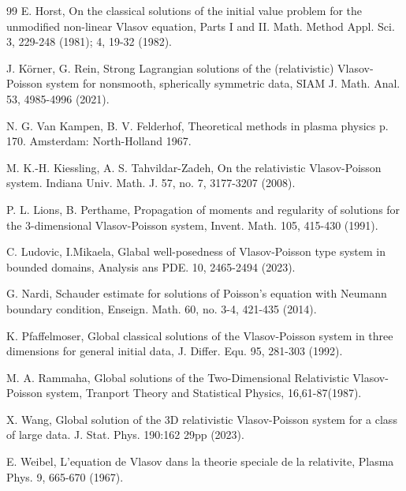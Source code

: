 \documentclass[11pt,reqno]{amsart}%
\theoremstyle{definition}
\theoremstyle{remark}
\begin{document}
\begin{thebibliography}{99}
E. Horst, On the classical solutions of the initial value problem for the unmodified non-linear Vlasov
equation, Parts I and II. Math. Method Appl. Sci. 3, 229-248 (1981); 4, 19-32 (1982).

J. K\"{o}rner, G. Rein, Strong Lagrangian solutions of the (relativistic) Vlasov-Poisson system for nonsmooth, spherically symmetric data,
SIAM J. Math. Anal. 53, 4985-4996 (2021).



 N. G. Van Kampen,  B. V. Felderhof, Theoretical methods in plasma physics p. 170. Amsterdam:
North-Holland 1967.

M. K.-H. Kiessling, A. S. Tahvildar-Zadeh, On the relativistic Vlasov-Poisson system.
Indiana Univ. Math. J. 57, no. 7, 3177-3207 (2008).


P. L. Lions, B. Perthame, Propagation of moments and regularity of solutions for the
3-dimensional Vlasov-Poisson system, Invent. Math. 105, 415-430 (1991).

C. Ludovic, I.Mikaela, Glabal well-posedness of Vlasov-Poisson type system in bounded domains, Analysis ans PDE.  10, 2465-2494 (2023).


G. Nardi, Schauder estimate for solutions of Poisson's equation
with Neumann boundary condition,  Enseign. Math. 60, no. 3-4, 421-435  (2014).

K. Pfaffelmoser, Global classical solutions of the Vlasov-Poisson system in three
dimensions for general initial data, J. Differ. Equ. 95, 281-303 (1992).

M. A. Rammaha, Global  solutions of the Two-Dimensional Relativistic Vlasov-Poisson system,
Tranport Theory and Statistical Physics, 16,61-87(1987).

 X. Wang, Global solution of the 3D relativistic Vlasov-Poisson system for a class of large data.
J. Stat. Phys. 190:162 29pp (2023).

E. Weibel, L'equation de Vlasov dans la theorie speciale de la relativite, Plasma Phys. 9, 665-670
(1967).










\end{thebibliography}
\end{document}
